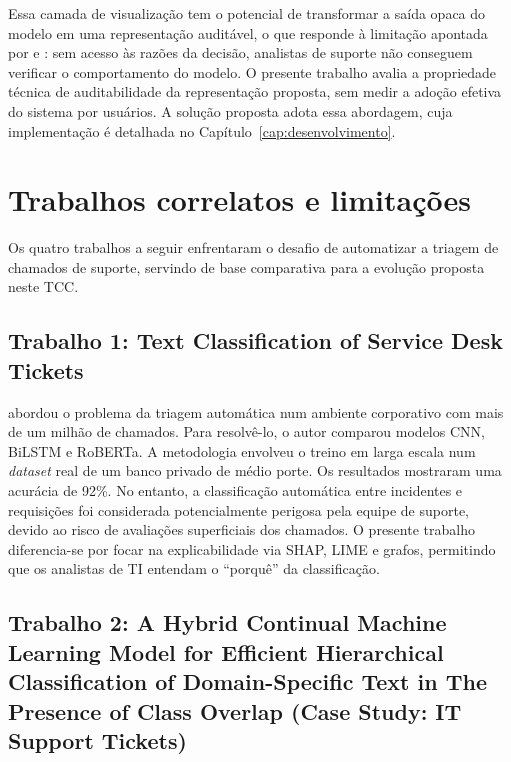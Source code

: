 \documentclass[
    12pt,                %
    openright,           %
    oneside,             %
    a4paper,             %
    english,             %
    brazil               %
]{abntex2}
\begin{document}
Essa camada de visualização tem o potencial de transformar a saída 
opaca do modelo em uma representação auditável, o que responde à 
limitação apontada por  e : 
sem acesso às razões da decisão, analistas de suporte não conseguem 
verificar o comportamento do modelo. O presente trabalho avalia a 
propriedade técnica de auditabilidade da representação proposta, sem 
medir a adoção efetiva do sistema por usuários. A solução proposta 
adota essa abordagem, cuja implementação é detalhada no 
Capítulo~\ref{cap:desenvolvimento}.
\section{Trabalhos correlatos e limitações}
\label{sec:trabalhos_relacionados}

Os quatro trabalhos a seguir enfrentaram o desafio de automatizar a triagem de chamados de suporte, servindo de base comparativa para a evolução proposta neste TCC.

\subsection{Trabalho 1: Text Classification of Service Desk Tickets}

 abordou o problema da triagem automática num ambiente corporativo com mais de um milhão de chamados. 
Para resolvê-lo, o autor comparou modelos CNN, BiLSTM e RoBERTa. A metodologia envolveu o treino em larga escala 
num \textit{dataset} real de um banco privado de médio porte. Os resultados mostraram uma acurácia de 92\%. 
No entanto, a classificação automática entre incidentes e requisições foi considerada potencialmente 
perigosa pela equipe de suporte, devido ao risco de avaliações superficiais dos chamados. O presente trabalho 
diferencia-se por focar na explicabilidade via SHAP, LIME e grafos, permitindo que os analistas de TI 
entendam o ``porquê'' da classificação.

\subsection{Trabalho 2: A Hybrid Continual Machine Learning Model for Efficient Hierarchical Classification of Domain-Specific Text in The Presence of Class Overlap (Case Study: IT Support Tickets)}
\end{document}
